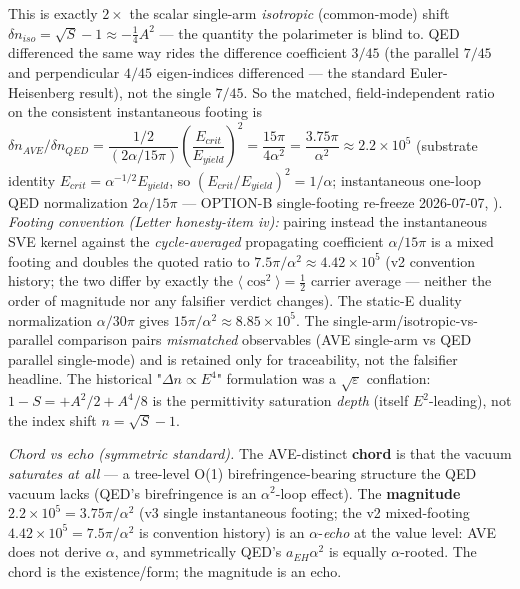 This is exactly $2\times$ the scalar single-arm \emph{isotropic} (common-mode) shift $\delta n_{iso}=\sqrt{S}-1\approx-\tfrac14 A^2$ --- the quantity the polarimeter is blind to. QED differenced the same way rides the difference coefficient $3/45$ (the parallel $7/45$ and perpendicular $4/45$ eigen-indices differenced --- the standard Euler-Heisenberg result), not the single $7/45$. So the matched, field-independent ratio on the consistent instantaneous footing is $\delta n_{AVE}/\delta n_{QED} = \dfrac{1/2}{(2\alpha/15\pi)}\left(\dfrac{E_{crit}}{E_{yield}}\right)^{2} = \dfrac{15\pi}{4\alpha^2}=\dfrac{3.75\pi}{\alpha^2}\approx 2.2\times10^5$ (substrate identity $E_{crit}=\alpha^{-1/2}E_{yield}$, so $(E_{crit}/E_{yield})^2=1/\alpha$; instantaneous one-loop QED normalization $2\alpha/15\pi$ --- OPTION-B single-footing re-freeze 2026-07-07, ). \emph{Footing convention (Letter honesty-item iv):} pairing instead the instantaneous SVE kernel against the \emph{cycle-averaged} propagating coefficient $\alpha/15\pi$ is a mixed footing and doubles the quoted ratio to $7.5\pi/\alpha^2\approx4.42\times10^5$ (v2 convention history; the two differ by exactly the $\langle\cos^2\rangle=\tfrac12$ carrier average --- neither the order of magnitude nor any falsifier verdict changes). The static-E duality normalization $\alpha/30\pi$ gives $15\pi/\alpha^2\approx 8.85\times10^5$. The single-arm/isotropic-vs-parallel comparison pairs \emph{mismatched} observables (AVE single-arm vs QED parallel single-mode) and is retained only for traceability, not the falsifier headline. The historical "$\Delta n\propto E^4$" formulation was a $\sqrt{\varepsilon}$ conflation: $1-S=+A^2/2+A^4/8$ is the permittivity saturation \emph{depth} (itself $E^2$-leading), not the index shift $n=\sqrt{S}-1$.

\emph{Chord vs echo (symmetric standard).} The AVE-distinct \textbf{chord} is that the vacuum \emph{saturates at all} --- a tree-level O(1) birefringence-bearing structure the QED vacuum lacks (QED's birefringence is an $\alpha^2$-loop effect). The \textbf{magnitude} $2.2\times10^5=3.75\pi/\alpha^2$ (v3 single instantaneous footing; the v2 mixed-footing $4.42\times10^5=7.5\pi/\alpha^2$ is convention history) is an $\alpha$-\emph{echo} at the value level: AVE does not derive $\alpha$, and symmetrically QED's $a_{EH}\alpha^2$ is equally $\alpha$-rooted. The chord is the existence/form; the magnitude is an echo.

